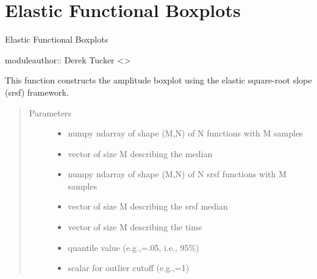 \documentclass[letterpaper,10pt,english]{sphinxmanual}
\begin{document}
\chapter{Elastic Functional Boxplots}
\label{\detokenize{boxplots:module-boxplots}}\label{\detokenize{boxplots:elastic-functional-boxplots}}\label{\detokenize{boxplots::doc}}
Elastic Functional Boxplots

moduleauthor:: Derek Tucker \textless{}\textgreater{}

\begin{fulllineitems}
\label{\detokenize{boxplots:boxplots.ampbox}}
This function constructs the amplitude boxplot using the elastic
square-root slope (srsf) framework.
\begin{quote}\begin{description}
\item[{Parameters}] \leavevmode\begin{itemize}
\item {} 
 \textendash{} numpy ndarray of shape (M,N) of N functions with M samples

\item {} 
 \textendash{} vector of size M describing the median

\item {} 
 \textendash{} numpy ndarray of shape (M,N) of N srsf functions with M samples

\item {} 
 \textendash{} vector of size M describing the srsf median

\item {} 
 \textendash{} vector of size M describing the time

\item {} 
 \textendash{} quantile value (e.g.,=.05, i.e., 95\%)

\item {} 
 \textendash{} scalar for outlier cutoff (e.g.,=1)


\end{itemize}
\end{description}
\end{quote}
\end{fulllineitems}
\end{document}
